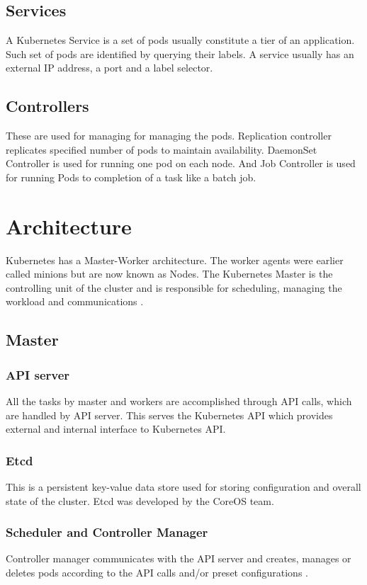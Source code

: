 \documentclass[9pt,twocolumn,twoside]{../../styles/osajnl}
\begin{document}
\subsection{Services}
A Kubernetes Service is a set of pods usually constitute a tier of an application. Such set of pods are identified by querying their labels. A service usually has an external IP address, a port and a label selector.

\subsection{Controllers}
 These are used for managing for managing the pods. Replication controller replicates specified number of pods to maintain availability. DaemonSet Controller is used for running one pod on each node. And Job Controller is used for running Pods to completion of a task like a batch job.

\section{Architecture}

Kubernetes has a Master-Worker architecture. The worker agents were earlier called minions but are now known as Nodes.
The Kubernetes Master is the controlling unit of the cluster and is responsible for scheduling, managing the workload and communications \cite{www-kubernetesebook}.



\subsection{Master}
\subsubsection{API server}
All the tasks by master and workers are accomplished through API calls, which are handled by API server. This serves the Kubernetes API which provides external and internal interface to Kubernetes API. 
\subsubsection{Etcd}
This is a persistent key-value data store used for storing configuration and overall state of the cluster. Etcd was developed by the CoreOS team.

\subsubsection{Scheduler and Controller Manager}
Controller manager communicates with the API server and creates, manages or deletes pods according to the API calls and/or preset configurations \cite{www-kuberneteswiki}.
\end{document}

